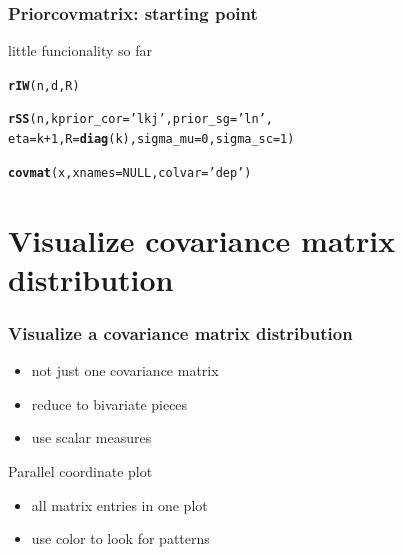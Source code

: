 \documentclass[9pt]{beamer}\usepackage[]{graphicx}\usepackage[]{color}
\makeatletter
\newcommand{\hlstr}[1]{\textcolor[rgb]{0.192,0.494,0.8}{#1}}%
\newcommand{\hlkwd}[1]{\textcolor[rgb]{0.737,0.353,0.396}{\textbf{#1}}}%
\newenvironment{kframe}{%
 \def\at@end@of@kframe{}%
 \ifinner\ifhmode%
  \def\at@end@of@kframe{\end{minipage}}%
  \begin{minipage}{\columnwidth}%
 \fi\fi%
 \def\FrameCommand##1{\hskip\@totalleftmargin \hskip-\fboxsep
 \colorbox{shadecolor}{##1}\hskip-\fboxsep
     \hskip-\linewidth \hskip-\@totalleftmargin \hskip\columnwidth}%
 \MakeFramed {\advance\hsize-\width
   \@totalleftmargin\z@ \linewidth\hsize
   \@setminipage}}%
 {\par\unskip\endMakeFramed%
 \at@end@of@kframe}
\newenvironment{knitrout}{}{} %
\makeatother
\begin{document}
\begin{frame}[fragile]
\frametitle{Priorcovmatrix: starting point }

little funcionality so far
\begin{knitrout}
\color{fgcolor}\begin{kframe}
\begin{alltt}
\hlkwd{rIW}(n, d, R)

\hlkwd{rSS}(n, k prior_cor = \hlstr{'lkj'}, prior_sg =\hlstr{'ln'}, 
    eta = k+1, R = \hlkwd{diag}(k), sigma_mu=0, sigma_sc=1)

\hlkwd{covmat}(x, xnames = NULL, colvar = \hlstr{'dep'})
\end{alltt}
\end{kframe}
\end{knitrout}
\end{frame}

\section{ Visualize covariance matrix distribution }

\begin{frame}[fragile]
\frametitle{ Visualize a covariance matrix \textbf{distribution} }

\begin{itemize}
  \item not just one covariance matrix 
  \vspace{.1cm}
  \item reduce to bivariate pieces \citep{visualize}
  \vspace{.1cm}
  \item use scalar measures \citep{pena2003descriptive}
\end{itemize}

Parallel coordinate plot
\begin{itemize}
  \item all matrix entries in one plot
  \item use color to look for patterns
\end{itemize}

\end{frame}
\end{document}
